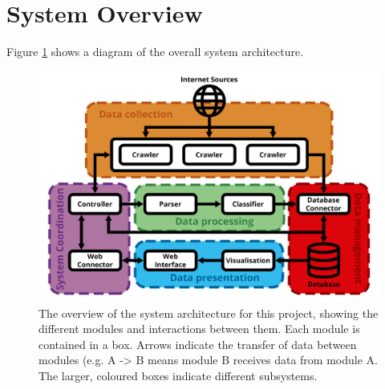 \documentclass{l4proj}
\begin{document}
\section{System Overview}
Figure \ref{fig:system_overview_diagram} shows a diagram of the overall system architecture.
 \begin{figure}[h]
\centering
\includegraphics[width=\textwidth]{images/system_overview_diagram.png}
\caption{The overview of the system architecture for this project, showing the different modules and interactions between them. Each module is contained in a box. Arrows indicate the transfer of data between modules (e.g. A -> B means module B receives data from module A. The larger, coloured boxes indicate different subsystems. }
\label{fig:system_overview_diagram}
\end{figure}
\par
\end{document}
